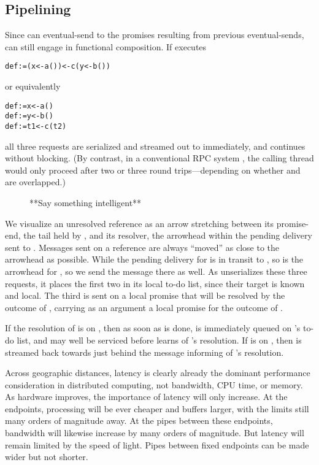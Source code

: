 \documentclass{llncs}
\begin{document}
\subsection{Pipelining}

Since  can eventual-send to the promises resulting from
previous eventual-sends,  can still engage in functional
composition. If  executes
%
\begin{alltt}
    def  := (x <- a()) <- c(y <- b())
\end{alltt}
%
or equivalently
%
\begin{alltt}
    def  := x <- a()
    def  := y <- b()
    def  := t1 <- c(t2)
\end{alltt}
%
all three requests are serialized and streamed out to 
immediately, and  continues without blocking. (By contrast, in
a conventional RPC system
\cite{Nelson81,java:rmi,corba:latency,xml-rpc:latency}, the calling
thread would only proceed after two or three round trips---depending
on whether  and  are overlapped.)
%
\begin{figure}
\centerline{}
\caption{**Say something intelligent**}
\label{fig:pipeline}
\end{figure}
%
We visualize an unresolved reference as an arrow stretching between
its promise-end, the tail held by , and its resolver, the arrowhead
within the pending delivery sent to . Messages sent on a reference
are always ``moved'' as close to the arrowhead as possible. While the
pending delivery for  is in transit to , so is the
arrowhead for , so we send the  message there as
well. As  unserializes these three requests, it places the first
two in its local to-do list, since their target is known and
local. The third is sent on a local promise that will be resolved by
the outcome of , carrying as an argument a local promise for
the outcome of .

If the resolution of  is on , then as soon as
 is done,  is immediately queued on 's
to-do list, and may well be serviced before  learns of
's resolution. If  is on , then  is
streamed back towards  just behind the message informing
 of 's resolution.

Across geographic distances, latency is clearly already the dominant
performance consideration in distributed computing, not bandwidth, CPU
time, or memory. As hardware improves, the importance of latency will
only increase. At the endpoints, processing will be ever cheaper and
buffers larger, with the limits still many orders of magnitude
away. At the pipes between these endpoints, bandwidth will likewise
increase by many orders of magnitude. But latency will remain limited
by the speed of light. Pipes between fixed endpoints can be made wider
but not shorter.
\end{document}

